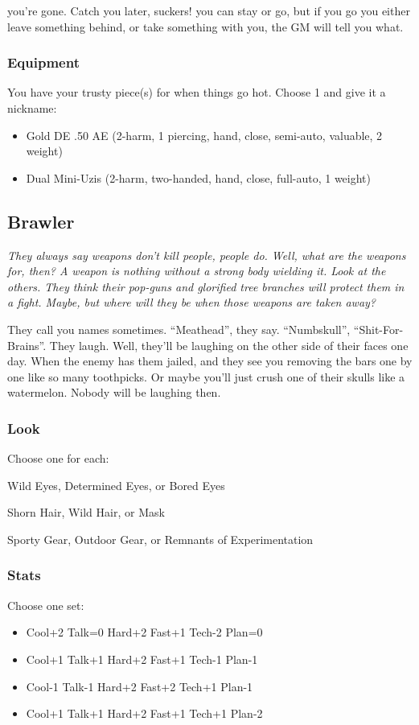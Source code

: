 {you're gone. Catch you later, suckers!}
{you can stay or go, but if you go you either leave something behind, or take something with you, the GM will tell you what.}

\subsubsection{Equipment}
You have your trusty piece(s) for when things go hot. Choose 1 and give it a nickname:
\begin{itemize}
\item Gold DE .50 AE (2-harm, 1 piercing, hand, close, semi-auto, valuable, 2 weight)
\item Dual Mini-Uzis (2-harm, two-handed, hand, close, full-auto, 1 weight) 
\end{itemize}



\subsection{Brawler}
{\itshape They always say weapons don't kill people, people do. Well, what are the weapons for, then? A weapon is nothing without a strong body wielding it. Look at the others. They think their pop-guns and glorified tree branches will protect them in a fight. Maybe, but where will they be when those weapons are taken away?

They call you names sometimes. ``Meathead'', they say. ``Numbskull'', ``Shit-For-Brains''. They laugh. Well, they'll be laughing on the other side of their faces one day. When the enemy has them jailed, and they see you removing the bars one by one like so many toothpicks. Or maybe you'll just crush one of their skulls like a watermelon. Nobody will be laughing then.}

\subsubsection{Look}
Choose one for each:

Wild Eyes, Determined Eyes, or Bored Eyes

Shorn Hair, Wild Hair, or Mask

Sporty Gear, Outdoor Gear, or Remnants of Experimentation

\subsubsection{Stats}
Choose one set:
\begin{itemize}
\setlength\itemsep{0em}
\item Cool+2 Talk=0 Hard+2 Fast+1 Tech-2 Plan=0
\item Cool+1 Talk+1 Hard+2 Fast+1 Tech-1 Plan-1
\item Cool-1 Talk-1 Hard+2 Fast+2 Tech+1 Plan-1
\item Cool+1 Talk+1 Hard+2 Fast+1 Tech+1 Plan-2
\end{itemize}

